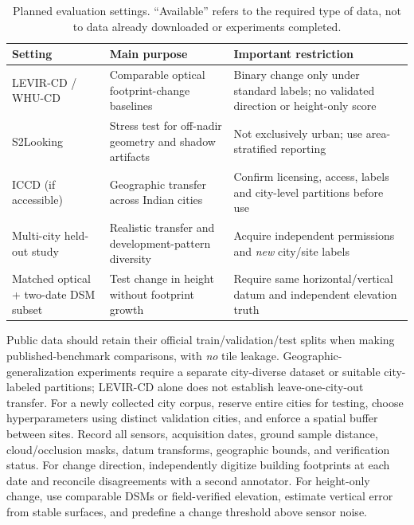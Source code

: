 \documentclass[11pt,a4paper]{article}
\newcommand{\tabhead}[1]{\textbf{#1}}
\begin{document}
\begin{table}[htbp]
\centering\footnotesize
\caption{Planned evaluation settings. ``Available'' refers to the required type of data, not to data already downloaded or experiments completed.}
\label{tab:protocol}
\begin{tabular}{@{}>{\raggedright\arraybackslash}p{}>{\raggedright\arraybackslash}p{}>{\raggedright\arraybackslash}p{}@{}}
\toprule
\tabhead{Setting} & \tabhead{Main purpose} & \tabhead{Important restriction}\\
\midrule
LEVIR-CD / WHU-CD & Comparable optical footprint-change baselines & Binary change only under standard labels; no validated direction or height-only score \\
S2Looking & Stress test for off-nadir geometry and shadow artifacts & Not exclusively urban; use area-stratified reporting \\
ICCD (if accessible) \citep{Srivastava2026} & Geographic transfer across Indian cities & Confirm licensing, access, labels and city-level partitions before use \\
Multi-city held-out study & Realistic transfer and development-pattern diversity & Acquire independent permissions and \emph{new} city/site labels \\
Matched optical + two-date DSM subset & Test change in height without footprint growth & Require same horizontal/vertical datum and independent elevation truth \\
\bottomrule
\end{tabular}
\end{table}

Public data should retain their official train/validation/test splits when making published-benchmark comparisons, with \emph{no} tile leakage. Geographic-generalization experiments require a separate city-diverse dataset or suitable city-labeled partitions; LEVIR-CD alone does not establish leave-one-city-out transfer. For a newly collected city corpus, reserve entire cities for testing, choose hyperparameters using distinct validation cities, and enforce a spatial buffer between sites. Record all sensors, acquisition dates, ground sample distance, cloud/occlusion masks, datum transforms, geographic bounds, and verification status. For change direction, independently digitize building footprints at each date and reconcile disagreements with a second annotator. For height-only change, use comparable DSMs or field-verified elevation, estimate vertical error from stable surfaces, and predefine a change threshold above sensor noise.
\end{document}
